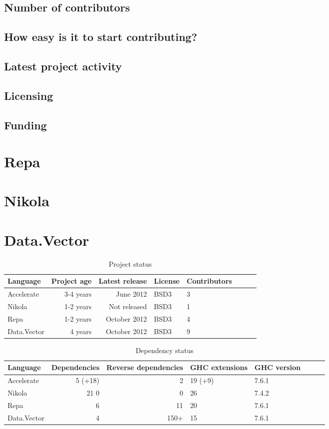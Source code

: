 \subsection{Number of contributors}
\subsection{How easy is it to start contributing?}
\subsection{Latest project activity}
\subsection{Licensing}
\subsection{Funding}
\section{Repa}
\section{Nikola}
\section{Data.Vector}

\begin{table}
  \centering
  \begin{tabular}{l|rrllllr}
    Language    & Project age & Latest release & License & Contributors \\ \hline
    Accelerate  & 3-4 years   & June 2012      & BSD3    & 3 \\
    Nikola      & 1-2 years   & Not released   & BSD3    & 1 \\
    Repa        & 1-2 years   & October 2012   & BSD3    & 4 \\
    Data.Vector & 4 years     & October 2012   & BSD3    & 9 \\
  \end{tabular}
  \caption{Project status}
  \label{tab:project_status}
\end{table}

\begin{table}
  \centering
  \begin{tabular}{l|rrllllr}
    Language    & Dependencies & Reverse dependencies & GHC extensions & GHC version \\ \hline
    Accelerate  & 5 (+18)      & 2                    & 19 (+9)        & 7.6.1 \\
    Nikola      & 21 0         & 0                    & 26             & 7.4.2 \\
    Repa        & 6            & 11                   & 20             & 7.6.1 \\
    Data.Vector & 4            & 150+                 & 15             & 7.6.1 \\
  \end{tabular}
  \caption{Dependency status}
  \label{tab:dependency_status}
\end{table}


